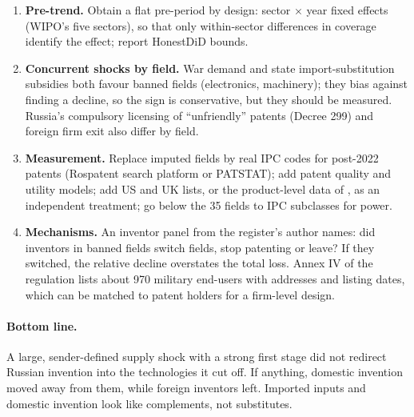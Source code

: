 \documentclass[11pt,a4paper]{article}
\begin{document}
\begin{enumerate}\setlength\itemsep{0.1em}
  \item \textbf{Pre-trend.} Obtain a flat pre-period by design: sector $\times$ year fixed effects (WIPO's five
  sectors), so that only within-sector differences in coverage identify the effect; report HonestDiD bounds.
  \item \textbf{Concurrent shocks by field.} War demand and state import-substitution subsidies both favour banned
  fields (electronics, machinery); they bias against finding a decline, so the sign is conservative, but they
  should be measured. Russia's compulsory licensing of ``unfriendly'' patents (Decree 299) and foreign firm exit
  also differ by field.
  \item \textbf{Measurement.} Replace imputed fields by real IPC codes for post-2022 patents (Rospatent search
  platform or PATSTAT); add patent quality and utility models; add US and UK lists, or the product-level data of
  \citet{EgorovEtAl2026}, as an independent treatment; go below the 35 fields to IPC subclasses for power.
  \item \textbf{Mechanisms.} An inventor panel from the register's author names: did inventors in banned fields
  switch fields, stop patenting or leave? If they switched, the relative decline overstates the total loss.
  Annex IV of the regulation lists about 970 military end-users with addresses and listing dates, which can be
  matched to patent holders for a firm-level design.
\end{enumerate}

\paragraph{Bottom line.} A large, sender-defined supply shock with a strong first stage did not redirect Russian
invention into the technologies it cut off. If anything, domestic invention moved away from them, while foreign
inventors left. Imported inputs and domestic invention look like complements, not substitutes.
\end{document}
